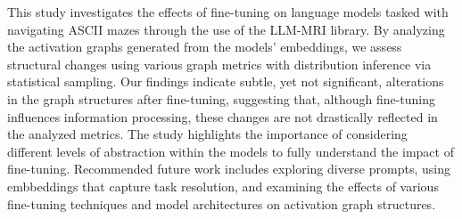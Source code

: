
\begin{abstractutfpr}%
This study investigates the effects of fine-tuning on language models tasked with navigating ASCII mazes through the use of the LLM-MRI library. By analyzing the activation graphs generated from the models' embeddings, we assess structural changes using various graph metrics with distribution inference via statistical sampling. Our findings indicate subtle, yet not significant, alterations in the graph structures after fine-tuning, suggesting that, although fine-tuning influences information processing, these changes are not drastically reflected in the analyzed metrics. The study highlights the importance of considering different levels of abstraction within the models to fully understand the impact of fine-tuning. Recommended future work includes exploring diverse prompts, using embbeddings that capture task resolution, and examining the effects of various fine-tuning techniques and model architectures on activation graph structures.
\end{abstractutfpr}

